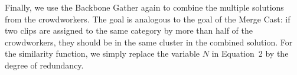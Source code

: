
Finally, we use the Backbone Gather again to combine the multiple solutions
from the crowdworkers. The goal is analogous to the goal of the Merge Cast: if
two clips are assigned to the same category by more than half of the
crowdworkers, they should be in the same cluster in the combined solution.
For the similarity function, we simply replace the
variable $N$ in Equation~2 by the degree of redundancy.

% 


% 





